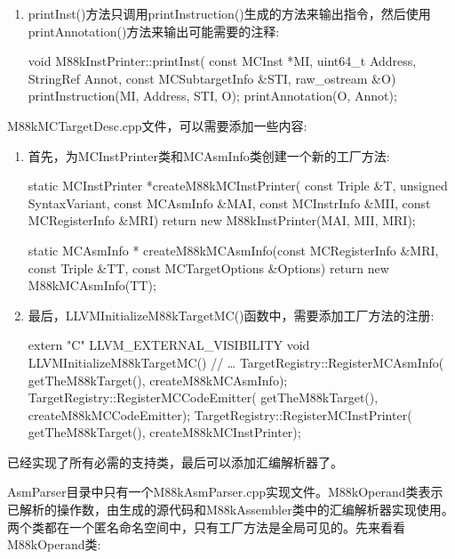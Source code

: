 \begin{enumerate}
\item
printInst()方法只调用printInstruction()生成的方法来输出指令，然后使用printAnnotation()方法来输出可能需要的注释:

\begin{cpp}
void M88kInstPrinter::printInst(
        const MCInst *MI, uint64_t Address, StringRef Annot,
        const MCSubtargetInfo &STI, raw_ostream &O) {
    printInstruction(MI, Address, STI, O);
    printAnnotation(O, Annot);
}
\end{cpp}
\end{enumerate}


M88kMCTargetDesc.cpp文件，可以需要添加一些内容:

\begin{enumerate}
\item
首先，为MCInstPrinter类和MCAsmInfo类创建一个新的工厂方法:

\begin{cpp}
static MCInstPrinter *createM88kMCInstPrinter(
        const Triple &T, unsigned SyntaxVariant,
        const MCAsmInfo &MAI, const MCInstrInfo &MII,
        const MCRegisterInfo &MRI) {
    return new M88kInstPrinter(MAI, MII, MRI);
}

static MCAsmInfo *
        createM88kMCAsmInfo(const MCRegisterInfo &MRI,
        const Triple &TT,
        const MCTargetOptions &Options) {
    return new M88kMCAsmInfo(TT);
}
\end{cpp}

\item
最后，LLVMInitializeM88kTargetMC()函数中，需要添加工厂方法的注册:

\begin{cpp}
extern "C" LLVM_EXTERNAL_VISIBILITY void
LLVMInitializeM88kTargetMC() {
    // …
    TargetRegistry::RegisterMCAsmInfo(
        getTheM88kTarget(), createM88kMCAsmInfo);
    TargetRegistry::RegisterMCCodeEmitter(
        getTheM88kTarget(), createM88kMCCodeEmitter);
    TargetRegistry::RegisterMCInstPrinter(
        getTheM88kTarget(), createM88kMCInstPrinter);
}
\end{cpp}
\end{enumerate}

已经实现了所有必需的支持类，最后可以添加汇编解析器了。


AsmParser目录中只有一个M88kAsmParser.cpp实现文件。M88kOperand类表示已解析的操作数，由生成的源代码和M88kAssembler类中的汇编解析器实现使用。两个类都在一个匿名命名空间中，只有工厂方法是全局可见的。先来看看M88kOperand类:


